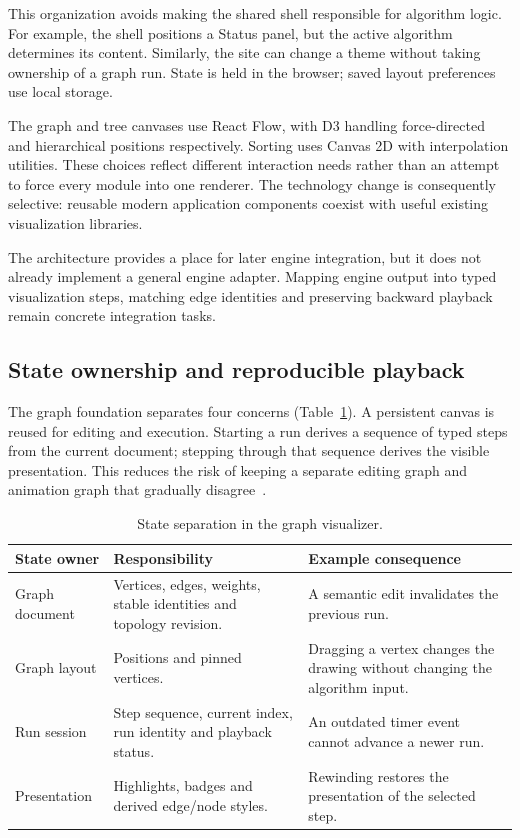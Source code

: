 \documentclass[11pt,a4paper]{article}
\newcommand{\page}{\par\penalty0 \ifdim\pagetotal>.72\textheight\clearpage\else\vspace{8pt}\fi}
\begin{document}
This organization avoids making the shared shell responsible for algorithm logic. For example, the shell positions a Status panel, but the active algorithm determines its content. Similarly, the site can change a theme without taking ownership of a graph run. State is held in the browser; saved layout preferences use local storage.

The graph and tree canvases use React Flow, with D3 handling force-directed and hierarchical positions respectively. Sorting uses Canvas 2D with interpolation utilities. These choices reflect different interaction needs rather than an attempt to force every module into one renderer. The technology change is consequently selective: reusable modern application components coexist with useful existing visualization libraries.

The architecture provides a place for later engine integration, but it does not already implement a general engine adapter. Mapping engine output into typed visualization steps, matching edge identities and preserving backward playback remain concrete integration tasks.

\page
\subsection{State ownership and reproducible playback}\label{sec:state}
The graph foundation separates four concerns (Table~\ref{tab:state}). A persistent canvas is reused for editing and execution. Starting a run derives a sequence of typed steps from the current document; stepping through that sequence derives the visible presentation. This reduces the risk of keeping a separate editing graph and animation graph that gradually disagree~\cite{architecture}.

\begin{table}[H]\small\centering
\caption{State separation in the graph visualizer.}\label{tab:state}
\begin{tabularx}{\linewidth}{@{}p{31mm}X X@{}}\toprule
State owner & Responsibility & Example consequence\\\midrule
Graph document & Vertices, edges, weights, stable identities and topology revision. & A semantic edit invalidates the previous run.\\
Graph layout & Positions and pinned vertices. & Dragging a vertex changes the drawing without changing the algorithm input.\\
Run session & Step sequence, current index, run identity and playback status. & An outdated timer event cannot advance a newer run.\\
Presentation & Highlights, badges and derived edge/node styles. & Rewinding restores the presentation of the selected step.\\\bottomrule
\end{tabularx}
\end{table}
\end{document}
